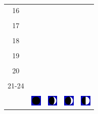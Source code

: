 \documentclass[a4paper,12pt, tikz]{scrartcl}
\begin{document}
\begin{tabularx}{\linewidth}{|c|X|X|p{2cm}|p{2cm}|}
            &   &       &    &   \\
          \hline
          16&   &                 &    &   \\
            &   &       &    &   \\
          \hline
          17&   &                 &    &   \\
            &   &       &    &   \\
          \hline
          18&   &                 &    &   \\
            &   &       &    &   \\
          \hline
          19&   &                 &     &   \\
            &   &       &    &   \\
          \hline
          20&   &              &    &   \\
            &   &       &    &   \\
          \hline 
          21-24&   &              &    &   \\
            &   &       &    &   \\
          \hline
                      & \vspace{0.01cm} \centerline{\includegraphics[width=0.5cm]{moon_phases/Moon_phase_0.svg.png}} \vspace{0.1cm} & \vspace{0.01cm} \centerline{\includegraphics[width=0.5cm]{moon_phases/Moon_phase_1.svg.png}} \vspace{0.1cm} & \vspace{0.01cm} \centerline{\includegraphics[width=0.5cm]{moon_phases/Moon_phase_1.svg.png}} \vspace{0.1cm} & \vspace{0.01cm} \centerline{\includegraphics[width=0.5cm]{moon_phases/Moon_phase_2.svg.png}} \vspace{0.1cm}\\
          \hline    
        \end{tabularx}
\end{document}
